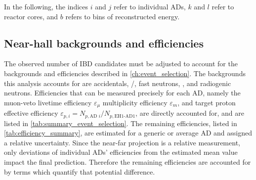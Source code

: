 In the following, the indices $i$ and $j$ refer to individual ADs,
$k$ and $l$ refer to reactor cores,
and $b$ refers to bins of reconstructed energy.

\subsection{Near-hall backgrounds and efficiencies}
\label{subsec:near_bg_eff}

The observed number of IBD candidates must be adjusted
to account for the backgrounds and efficiencies described in \cref{ch:event_selection}.
The backgrounds this analysis accounts for are
accidentals, \li{}/\he{}, fast neutrons, \amc{}, and radiogenic neutrons.
Efficiencies that can be measured precisely for each AD,
namely
the muon-veto livetime efficiency $\varepsilon_\mu$
multiplicity efficiency $\varepsilon_m$,
and target proton effective efficiency
$\varepsilon_{p,i}=N_{p,\text{AD }i}/N_{p,\text{EH1-AD1}}$,
are directly accounted for,
and are listed in \cref{tab:summary_event_selection}.
The remaining efficiencies, listed in \cref{tab:efficiency_summary},
are estimated for a generic or average AD and assigned a relative uncertainty.
Since the near-far projection is a relative measurement,
only deviations of individual ADs' efficiencies from the estimated mean value
impact the final prediction.
Therefore the remaining efficiencies are accounted for
by terms which quantify that potential difference.

